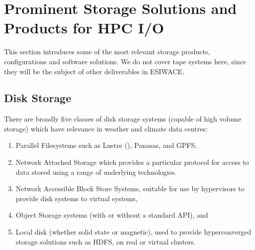 %
%
%


%



\section{Prominent Storage Solutions and Products for HPC I/O}
\label{sec:related work/pfs and object stores}

This section introduces some of the most relevant storage products, configurations and software solutions. We do not cover tape systems here, since they will
be the subject of other deliverables in ESIWACE.

\subsection{Disk Storage}

There are broadly five classes of disk storage systems (capable of high volume
storage) which have relevance in weather and climate data centres:
\begin{enumerate}
    \item Parallel Filesystems such as Lustre (), Panasas, and GPFS.
    \item Network Attached Storage which provides a particular protocol for access to
    data stored using a range of underlying technologies.
    \item Network Accessible Block Store Systems, suitable for use by hypervisors to provide disk systems to virtual systems,
    \item Object Storage systems (with or without a standard API), and
    \item Local disk (whether solid state or magnetic), used to provide
    hyperconverged storage solutions such as HDFS, on real or virtual clusters.
\end {enumerate}

